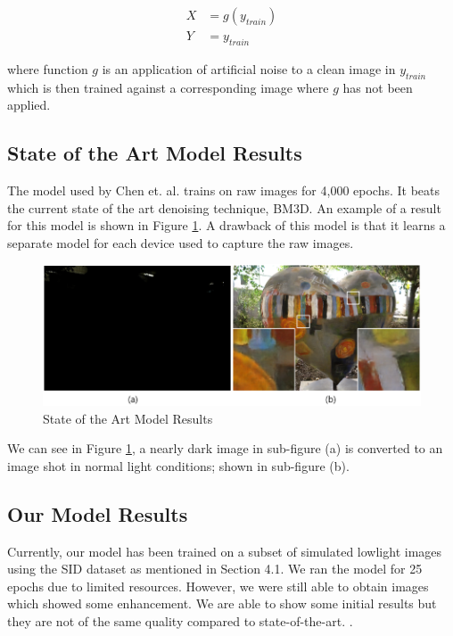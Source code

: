 \documentclass{article}
\begin{document}
\begin{align*}
  X &= g(y_{train})\\
  Y &= y_{train}
\end{align*}

where function $g$ is an application of artificial noise to a clean
image in $y_{train}$ which is then trained against a corresponding
image where $g$ has not been applied.

\subsection{State of the Art Model Results}

The model used by Chen et. al. \cite{chen2018learning} trains on raw
images for 4,000 epochs. It beats the current state of the art denoising
technique, BM3D. An example of a result for this model is shown in
Figure \ref{fig:train}. A drawback of this model is that it learns a
separate model for each device used to capture the raw images.

\begin{figure}[ht]
  \centering
  \includegraphics[scale=0.35]{Their_results}
  \caption{ State of the Art Model Results}
  \label{fig:train}
\end{figure}

We can see in Figure \ref{fig:train}, a nearly dark image in sub-figure
(a) is converted to an image shot in normal light conditions; shown
in sub-figure (b).

\subsection{Our Model Results}

Currently, our model has been trained on a subset of simulated lowlight
images using the SID dataset as mentioned in Section 4.1. We ran the model
for 25 epochs due to limited resources. However, we were still able to obtain
images which showed some enhancement. We are able to show some initial
results but they are not of the same quality compared to state-of-the-art.
\cite{chen2018learning}. 
\end{document}
